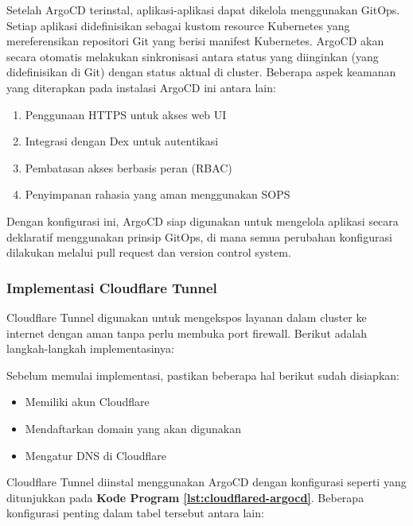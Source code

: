 Setelah ArgoCD terinstal, aplikasi-aplikasi dapat dikelola menggunakan GitOps.
Setiap aplikasi didefinisikan sebagai kustom resource Kubernetes yang
mereferensikan repositori Git yang berisi manifest Kubernetes. ArgoCD akan
secara otomatis melakukan sinkronisasi antara status yang diinginkan (yang
didefinisikan di Git) dengan status aktual di cluster. Beberapa aspek keamanan
yang diterapkan pada instalasi ArgoCD ini antara lain:

\begin{enumerate}[label=\alph*.]
  \item Penggunaan HTTPS untuk akses web UI
  \item Integrasi dengan Dex untuk autentikasi
  \item Pembatasan akses berbasis peran (RBAC)
  \item Penyimpanan rahasia yang aman menggunakan SOPS
\end{enumerate}

Dengan konfigurasi ini, ArgoCD siap digunakan untuk mengelola aplikasi secara
deklaratif menggunakan prinsip GitOps, di mana semua perubahan konfigurasi
dilakukan melalui pull request dan version control system.

\subsubsection{Implementasi Cloudflare Tunnel}
Cloudflare Tunnel digunakan untuk mengekspos layanan dalam cluster ke internet
dengan aman tanpa perlu membuka port firewall. Berikut adalah langkah-langkah
implementasinya:

Sebelum memulai implementasi, pastikan beberapa hal berikut sudah disiapkan:
\begin{itemize}
  \item Memiliki akun Cloudflare
  \item Mendaftarkan domain yang akan digunakan
  \item Mengatur DNS di Cloudflare
\end{itemize}

Cloudflare Tunnel diinstal menggunakan ArgoCD dengan konfigurasi seperti yang
ditunjukkan pada \textbf{Kode Program \ref{lst:cloudflared-argocd}}. Beberapa
konfigurasi penting dalam tabel tersebut antara lain:

